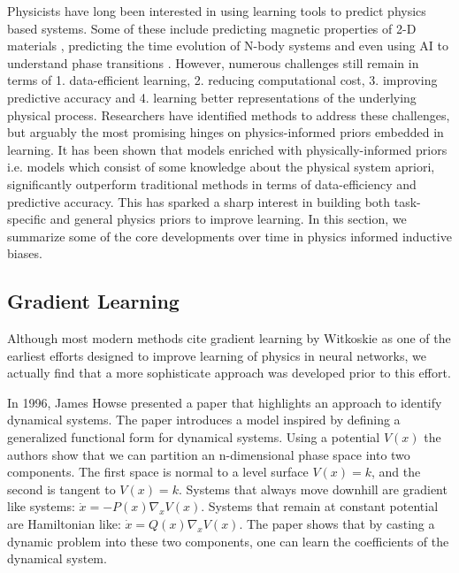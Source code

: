 \documentclass{article}
\begin{document}
Physicists have long been interested in using learning tools to predict physics based systems. Some of these include predicting magnetic properties of 2-D materials \cite{rhone_data-driven_2018}, predicting the time evolution of N-body systems \cite{battaglia_relational_2018} and even using AI to understand phase transitions \cite{bapst_unveiling_2020}. However, numerous challenges still remain in terms of 1. data-efficient learning, 2. reducing computational cost, 3. improving predictive accuracy and 4. learning better representations of the underlying physical process. Researchers have identified methods to address these challenges, but arguably the most promising hinges on physics-informed priors embedded in learning. It has been shown that models enriched with physically-informed priors i.e. models which consist of some knowledge about the physical system apriori, significantly outperform traditional methods in terms of data-efficiency and predictive accuracy. This has sparked a sharp interest in building both task-specific and general physics priors to improve learning. In this section, we summarize some of the core developments over time in physics informed inductive biases. 

\subsection{Gradient Learning}

Although most modern methods cite gradient learning by Witkoskie \cite{witkoskie_neural_2005} as one of the earliest efforts designed to improve learning of physics in neural networks, we actually find that a more sophisticate approach was developed prior to this effort.

In 1996, James Howse \cite{howse_gradient_1996} presented a paper that highlights an approach to identify dynamical systems. The paper introduces a model inspired by defining a generalized functional form for dynamical systems. Using a potential $V(x)$ the authors show that we can partition an n-dimensional phase space into two components. The first space is normal to a level surface $V(x)=k$, and the second is tangent to $V(x)=k$. Systems that always move downhill are gradient like systems: $ \dot{x} = - P(x)\nabla_{x} V(x) $. Systems that remain at constant potential are Hamiltonian like: $\dot{x} = Q(x)\nabla_x V(x)$. The paper shows that by casting a dynamic problem into these two components, one can learn the coefficients of the dynamical system. 
\end{document}
